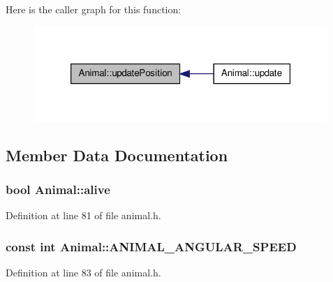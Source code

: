 Here is the caller graph for this function\-:\nopagebreak
\begin{figure}[H]
\begin{center}
\leavevmode
\includegraphics[width=316pt]{class_animal_a0b6103b76a223ce2eaad73877ff85c73_icgraph}
\end{center}
\end{figure}




\subsection{Member Data Documentation}
\hypertarget{class_animal_a38d08d48cf5b16863bb40fa731b06629}{
\subsubsection[{alive}]{\setlength{\rightskip}{0pt plus 5cm}bool Animal\-::alive\hspace{0.3cm}{\ttfamily [protected]}}}\label{class_animal_a38d08d48cf5b16863bb40fa731b06629}


Definition at line 81 of file animal.\-h.

\hypertarget{class_animal_a4004efb93813a375712ad5d82a404659}{
\subsubsection[{A\-N\-I\-M\-A\-L\-\_\-\-A\-N\-G\-U\-L\-A\-R\-\_\-\-S\-P\-E\-E\-D}]{\setlength{\rightskip}{0pt plus 5cm}const int Animal\-::\-A\-N\-I\-M\-A\-L\-\_\-\-A\-N\-G\-U\-L\-A\-R\-\_\-\-S\-P\-E\-E\-D\hspace{0.3cm}{\ttfamily [protected]}}}\label{class_animal_a4004efb93813a375712ad5d82a404659}


Definition at line 83 of file animal.\-h.

